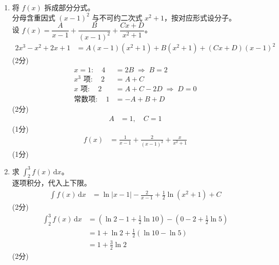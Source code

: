 \documentclass{exam-zh}
\begin{document}
\begin{solution}
    \begin{enumerate}[label=(\alph*)]
        \item 将 $f(x)$ 拆成部分分式。 \\
        分母含重因式 $(x-1)^2$ 与不可约二次式 $x^2+1$，按对应形式设分子。 \\
        设 $f(x)=\dfrac{A}{x-1}+\dfrac{B}{(x-1)^2}+\dfrac{Cx+D}{x^2+1}$。
        \begin{align*}
            2x^3-x^2+2x+1 &= A(x-1)(x^2+1)+B(x^2+1)+(Cx+D)(x-1)^2
        \end{align*}
        \hfill (2分) \\
        \begin{align*}
            x=1:\quad 4 &= 2B \;\Rightarrow\; B=2 \\
            x^3\text{ 项}:\quad 2 &= A+C \\
            x\text{ 项}:\quad 2 &= A+C-2D \;\Rightarrow\; D=0 \\
            \text{常数项}:\quad 1 &= -A+B+D
        \end{align*}
        \hfill (2分) \\
        \begin{align*}
            A &= 1,\quad C=1
        \end{align*}
        \hfill (1分) \\
        \begin{align*}
            f(x) &= \frac{1}{x-1}+\frac{2}{(x-1)^2}+\frac{x}{x^2+1}
        \end{align*}
        \hfill (1分)

        \item 求 $\displaystyle\int_2^3 f(x)\,\mathrm{d}x$。 \\
        逐项积分，代入上下限。
        \begin{align*}
            \int f(x)\,\mathrm{d}x &= \ln|x-1|-\frac{2}{x-1}+\frac12\ln(x^2+1)+C
        \end{align*}
        \hfill (2分) \\
        \begin{align*}
            \int_2^3 f(x)\,\mathrm{d}x &= \left(\ln2-1+\frac12\ln10\right)-\left(0-2+\frac12\ln5\right) \\
            &= 1+\ln2+\frac12(\ln10-\ln5) \\
            &= 1+\frac32\ln2
        \end{align*}
        \hfill (2分)
    \end{enumerate}
\end{solution}
\end{document}
